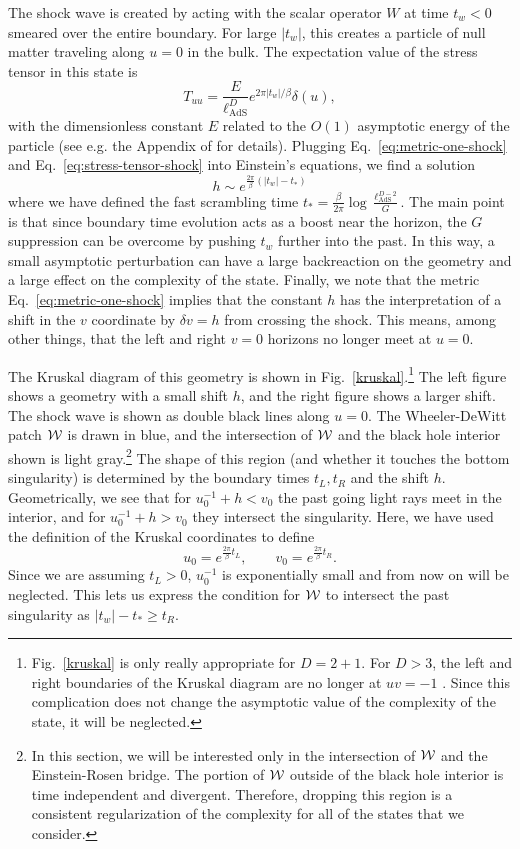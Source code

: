 \documentclass[12pt]{article}
\numberwithin{equation}{section}
\newcommand{\be}{\begin{equation}}
\newcommand{\ee}{\end{equation}}
\def\CW{{\cal W}}
\newcommand{\lads}{\ell_{\text{AdS}}}
\renewcommand{\eqref}[1]{Eq.~\ref{#1}}
\begin{document}
The shock wave is created by acting with the scalar operator $W$ at time $t_w<0$ smeared over the entire boundary. For large $|t_w|$, this creates a particle of null matter traveling along $u=0$ in the bulk. The expectation value of the stress tensor in this state is
\be
T_{uu} = \frac{E}{\lads^{D}} e^{ 2\pi |t_w| / \beta } \delta(u), \label{eq:stress-tensor-shock}
\ee
with the dimensionless constant $E$ related to the $O(1)$ asymptotic energy of the particle (see e.g. the Appendix of \cite{Roberts:2014ifa} for details). Plugging \eqref{eq:metric-one-shock} and \eqref{eq:stress-tensor-shock} into Einstein's equations,
we find a solution
\be
h \sim  e^{\frac{2\pi}{\beta}(|t_w| - t_* ) } \label{eq:shift}
\ee
where we have defined the fast scrambling time $t_* = \frac{\beta}{2\pi} \log \frac{\lads^{D-2} } {G}$. The main point is that since boundary time evolution acts as a boost near the horizon, the $G$ suppression can be overcome by pushing $t_w$ further into the past. In this way, a small asymptotic perturbation can have a large backreaction on the geometry and a large effect on the complexity of the state.
Finally, we note that the metric \eqref{eq:metric-one-shock} implies that the constant $h$ has the interpretation of a shift in the $v$ coordinate by $\delta v = h$ from crossing the shock. This means, among other things, that the left and right $v=0$ horizons no longer meet at $u=0$.

The Kruskal diagram of this geometry is shown in Fig.~\ref{kruskal}.\footnote{Fig.~\ref{kruskal} is only really appropriate for $D=2+1$. For $D>3$, the left and right boundaries of the Kruskal diagram are no longer at $uv=-1$ \cite{Fidkowski:2003nf}.  Since this complication does not change the asymptotic value of the complexity of the state, it will be neglected.} The left figure shows a geometry with a small shift $h$, and the right figure shows a larger shift. The shock wave is shown as double black lines along $u=0$.  The Wheeler-DeWitt patch $\CW$ is drawn in blue, and the intersection of $\CW$ and the black hole interior shown is light gray.\footnote{In this section, we will be interested only in the intersection of $\CW$ and the Einstein-Rosen bridge. The portion of $\CW$ outside of the black hole interior is time independent and divergent. Therefore, dropping this region is a consistent regularization of the complexity for all of the states that we consider.}  The shape of this region (and whether it touches the bottom singularity) is determined by the boundary times $t_L, t_R$ and the shift $h$. Geometrically, we see that for $u_0^{-1} + h  < v_0$ the past going light rays meet in the interior, and for $u_0^{-1} + h  > v_0$ they intersect the singularity. Here, we have used the definition of the Kruskal coordinates to define
\be
u_0 = e^{\frac{2\pi}{\beta} t_L}, \qquad v_0 = e^{\frac{2\pi}{\beta} t_R}. \label{eq:boundary-times-as-kruskal}
\ee
Since we are assuming $t_L > 0$, $u_0^{-1}$ is exponentially small and from now on will be neglected. This lets us express the condition for $\CW$ to intersect the past singularity as $|t_w| - t_* \ge t_R$.
\end{document}
